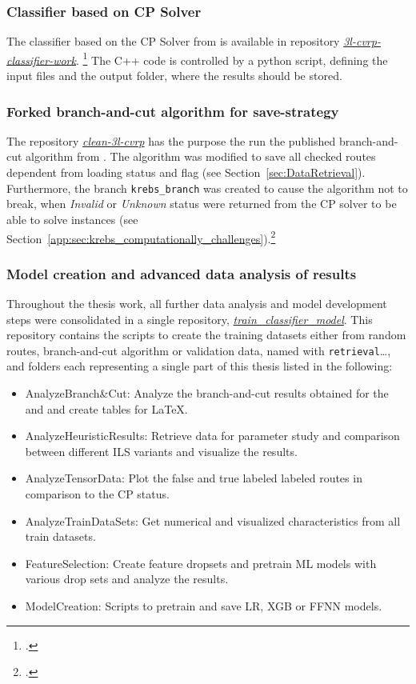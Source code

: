 \subsubsection{Classifier based on CP Solver}
The classifier based on the \gls{CP} Solver from \cite{tamke_repository_2024} is available in
repository \href{https://github.com/MxHbm/3l-cvrp-classifier-work}{\textit{3l-cvrp-classifier-work}}. \footcite{tamke_repository_2024}
The C++ code is controlled by a python script, defining the input files and the output folder, where the results should be stored.

\subsubsection{Forked branch-and-cut algorithm for save-strategy}
The  repository \href{https://github.com/MxHbm/clean-3l-cvrp}{\textit{clean-3l-cvrp}} has the purpose the run the published branch-and-cut algorithm from \cite{tamke_branch-and-cut_2024}. The algorithm
was modified to save all checked routes dependent from loading status and flag (see Section~\ref{sec:DataRetrieval}). Furthermore,
the branch \texttt{krebs\_branch} was created to cause the algorithm not to break, when \textit{Invalid} or \textit{Unknown}
status were returned from the \gls{CP} solver to be able to solve \krebsADataSetText instances (see Section~\ref{app:sec:krebs_computationally_challenges}).\footcite[cf.][]{tamke_branch-and-cut_2024}

\subsubsection{Model creation and advanced data analysis of results}

Throughout the thesis work, all further data analysis and model development steps were consolidated in a single repository,
\href{https://github.com/MxHbm/train_classifier_model}{\textit{train\_classifier\_model}}. This repository contains the scripts to
create the training datasets either from random routes, branch-and-cut algorithm or validation data, named with \texttt{retrieval}\dots,
and folders each representing a single part of this thesis listed in the following:
\begin{itemize}
	\item AnalyzeBranch\&Cut: Analyze the branch-and-cut results obtained for the \gendreauDataSetText and \krebsADataSetText and create tables for \LaTeX.
	\item AnalyzeHeuristicResults: Retrieve data for parameter study and comparison between different \gls{ILS} variants and visualize the results.
	\item AnalyzeTensorData: Plot the false and true labeled labeled routes in comparison to the \gls{CP} status.
	\item AnalyzeTrainDataSets: Get numerical and visualized characteristics from all train datasets.
	\item FeatureSelection: Create feature dropsets and pretrain \gls{ML} models with various drop sets and analyze the results.
	\item ModelCreation: Scripts to pretrain and save \gls{LR}, \gls{XGB} or \gls{FFNN} models.
\end{itemize}

